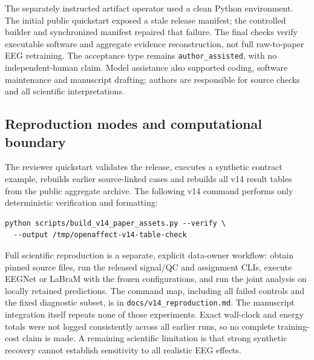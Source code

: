 The separately instructed artifact operator used a clean Python environment.
The initial public quickstart exposed a stale release manifest; the controlled
builder and synchronized manifest repaired that failure. The final checks
verify executable software and aggregate evidence reconstruction, not full
raw-to-paper EEG retraining. The acceptance type remains
\texttt{author\_assisted}, with no independent-human claim. Model assistance
also supported coding, software maintenance and manuscript drafting; authors
are responsible for source checks and all scientific interpretations.

\subsection{Reproduction modes and computational boundary}
The reviewer quickstart validates the release, executes a synthetic contract
example, rebuilds earlier source-linked cases and rebuilds all v14 result
tables from the public aggregate archive. The following v14 command performs
only deterministic verification and formatting:
\begin{verbatim}
python scripts/build_v14_paper_assets.py --verify \
  --output /tmp/openaffect-v14-table-check
\end{verbatim}
Full scientific reproduction is a separate, explicit data-owner workflow:
obtain pinned source files, run the released signal/QC and assignment CLIs,
execute EEGNet or LaBraM with the frozen configurations, and run the joint
analysis on locally retained predictions. The command map, including all
failed controls and the fixed diagnostic subset, is in
\texttt{docs/v14\_reproduction.md}. The manuscript integration itself repeats
none of those experiments. Exact wall-clock and energy totals were not logged
consistently across all earlier runs, so no complete training-cost claim is
made. A remaining scientific limitation is that strong synthetic recovery
cannot establish sensitivity to all realistic EEG effects.
